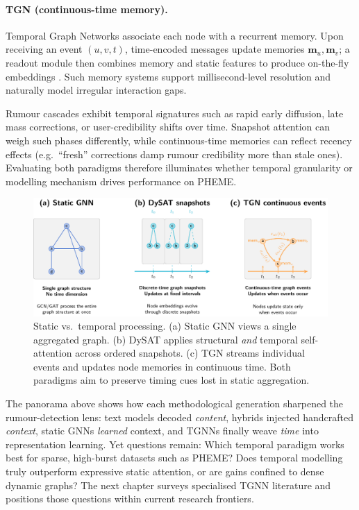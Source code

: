 \documentclass{cshonours}
\begin{document}
\paragraph{TGN (continuous-time memory).}
Temporal Graph Networks associate each node with a recurrent memory.  
Upon receiving an event \((u,v,t)\), time-encoded messages update memories \(\mathbf{m}_u,\mathbf{m}_v\); a readout module then combines memory and static features to produce on-the-fly embeddings \cite{rossi2020tgn}.  
Such memory systems support millisecond-level resolution and naturally model irregular interaction gaps.


Rumour cascades exhibit temporal signatures such as rapid early diffusion, late mass corrections, or user-credibility shifts over time.  Snapshot attention can weigh such phases differently, while continuous-time memories can reflect recency effects (e.g.\ “fresh” corrections damp rumour credibility more than stale ones).  Evaluating both paradigms therefore illuminates whether temporal granularity or modelling mechanism drives performance on PHEME.

\begin{figure}[htbp]
  \centering
  \includegraphics[width=.9\textwidth]{../figures/static_vs_temporal.pdf}
  \caption{Static vs.~temporal processing.  (a) Static GNN views a single aggregated graph. (b) DySAT applies structural \emph{and} temporal self-attention across ordered snapshots. (c) TGN streams individual events and updates node memories in continuous time.  Both paradigms aim to preserve timing cues lost in static aggregation.}
  \label{fig:temporal_overview}
\end{figure}


The panorama above shows how each methodological generation sharpened the rumour-detection lens:  
text models decoded \emph{content}, hybrids injected handcrafted \emph{context}, static GNNs \emph{learned} context, and TGNNs finally weave \emph{time} into representation learning.  Yet questions remain: Which temporal paradigm works best for sparse, high-burst datasets such as PHEME?  Does temporal modelling truly outperform expressive static attention, or are gains confined to dense dynamic graphs?  The next chapter surveys specialised TGNN literature and positions those questions within current research frontiers.
\end{document}
